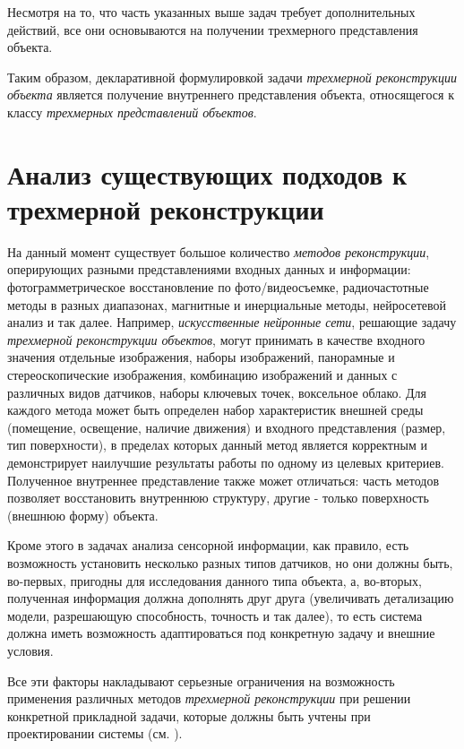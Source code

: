 Несмотря на то, что часть указанных выше задач требует дополнительных действий, все они основываются на получении трехмерного представления объекта.

Таким образом, декларативной формулировкой задачи \textit{трехмерной реконструкции объекта} является получение внутреннего представления объекта, относящегося к классу \textit{трехмерных представлений объектов}.

\section{Анализ существующих подходов к трехмерной реконструкции}
\label{sec_3d_models_analysis}

На данный момент существует большое количество \textit{методов реконструкции}, оперирующих разными представлениями входных данных и информации: фотограмметрическое восстановление по фото/видеосъемке, радиочастотные методы в разных диапазонах, магнитные и инерциальные методы, нейросетевой анализ и так далее. Например, \textit{искусственные нейронные сети}, решающие задачу \textit{трехмерной реконструкции объектов}, могут принимать в качестве входного значения отдельные изображения, наборы изображений, панорамные и стереоскопические изображения, комбинацию изображений и данных с различных видов датчиков, наборы ключевых точек, воксельное облако. Для каждого метода может быть определен набор характеристик внешней среды (помещение, освещение, наличие движения) и входного представления (размер, тип поверхности), в пределах которых данный метод является корректным и демонстрирует наилучшие результаты работы по одному из целевых критериев. Полученное внутреннее представление также может отличаться: часть методов позволяет восстановить внутреннюю структуру, другие - только поверхность (внешнюю форму) объекта.

Кроме этого в задачах анализа сенсорной информации, как правило, есть возможность установить несколько разных типов датчиков, но они должны быть, во-первых, пригодны для исследования данного типа объекта, а, во-вторых, полученная информация должна дополнять друг друга (увеличивать детализацию модели, разрешающую способность, точность и так далее), то есть система должна иметь возможность адаптироваться под конкретную задачу и внешние условия.

Все эти факторы накладывают серьезные ограничения на возможность применения различных методов \textit{трехмерной реконструкции} при решении конкретной прикладной задачи, которые должны быть учтены при проектировании системы (см. ).

